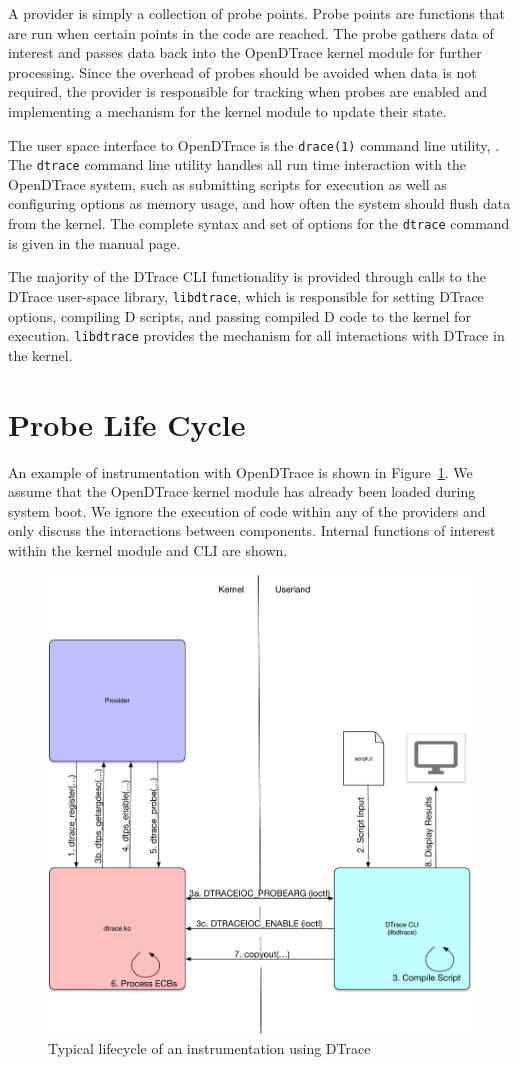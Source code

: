 A provider is simply a collection of probe points. Probe points are
functions that are run when certain points in the code are
reached. The probe gathers data of interest and passes data back into
the OpenDTrace kernel module for further processing. Since the
overhead of probes should be avoided when data is not required, the
provider is responsible for tracking when probes are enabled and
implementing a mechanism for the kernel module to update their state.

The user space interface to OpenDTrace is the \texttt{drace(1)}
command line utility, . The \texttt{dtrace} command line utility
handles all run time interaction with the OpenDTrace system, such as
submitting scripts for execution as well as configuring options as
memory usage, and how often the system should flush data from the
kernel.  The complete syntax and set of options for the
\texttt{dtrace} command is given in the manual page.

The majority of the DTrace CLI functionality is provided through calls
to the DTrace user-space library, \texttt{libdtrace}, which is
responsible for setting DTrace options, compiling D scripts, and
passing compiled D code to the kernel for
execution. \texttt{libdtrace} provides the mechanism for all
interactions with DTrace in the kernel.

\section{Probe Life Cycle}
\label{sec:lifecycle}

An example of instrumentation with OpenDTrace is shown in
Figure~\ref{fig:lifecycle}. We assume that the OpenDTrace kernel
module has already been loaded during system boot. We ignore the
execution of code within any of the providers and only discuss the
interactions between components. Internal functions of interest within
the kernel module and CLI are shown.

\begin{figure}[htpb]
	\centering
	\includegraphics[width=0.8\linewidth]{dtrace-lifecycle.pdf}
	\caption{Typical lifecycle of an instrumentation using DTrace}
	\label{fig:lifecycle}
\end{figure}

